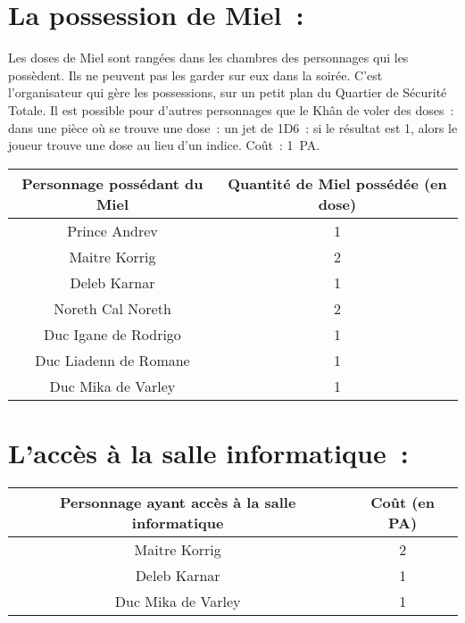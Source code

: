 \documentclass{article}
\begin{document}
\section*{La possession de Miel~:}

Les doses de Miel sont rangées dans les chambres des personnages qui les
possèdent. Ils ne peuvent pas les garder sur eux dans la soirée. C’est
l’organisateur qui gère les possessions, sur un petit plan du Quartier de
Sécurité Totale. Il est possible pour d'autres personnages que le Khân de
voler des doses~: dans une pièce où se trouve une dose~: un jet de 1D6~: si
le résultat est 1, alors le joueur trouve une dose au lieu d’un indice. Coût~:
1~PA.

\begin{center}
    \begin{tabular}{|c|c|}
        \hline
        Personnage possédant du Miel & Quantité de Miel possédée (en dose)\\
        \hline
        Prince Andrev & 1 \\
        Maitre Korrig & 2 \\
        Deleb Karnar & 1 \\
        Noreth Cal Noreth & 2 \\
        Duc Igane de Rodrigo & 1 \\
        Duc Liadenn de Romane & 1 \\
        Duc Mika de Varley & 1 \\
        \hline
    \end{tabular}
\end{center}

\section*{L'accès à la salle informatique~:}
\begin{center}
    \begin{tabular}{|c|c|}
        \hline
        Personnage ayant accès à la salle informatique & Coût (en PA)\\
        \hline
        Maitre Korrig & 2 \\
        Deleb Karnar & 1 \\
        Duc Mika de Varley & 1 \\
        \hline
    \end{tabular}
\end{center}
\end{document}
